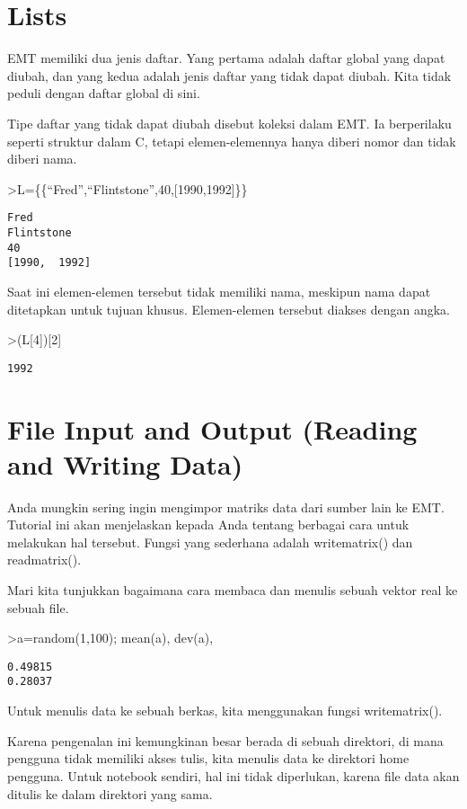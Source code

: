 \documentclass[
]{book}
\begin{document}
\section{Lists}\label{lists}

EMT memiliki dua jenis daftar. Yang pertama adalah daftar global yang dapat diubah, dan yang kedua adalah jenis daftar yang tidak dapat diubah. Kita tidak peduli dengan daftar global di sini.

Tipe daftar yang tidak dapat diubah disebut koleksi dalam EMT. Ia berperilaku seperti struktur dalam C, tetapi elemen-elemennya hanya diberi nomor dan tidak diberi nama.

\textgreater L=\{\{``Fred'',``Flintstone'',40,{[}1990,1992{]}\}\}

\begin{verbatim}
Fred
Flintstone
40
[1990,  1992]
\end{verbatim}

Saat ini elemen-elemen tersebut tidak memiliki nama, meskipun nama dapat ditetapkan untuk tujuan khusus. Elemen-elemen tersebut diakses dengan angka.

\textgreater(L{[}4{]}){[}2{]}

\begin{verbatim}
1992
\end{verbatim}

\section{File Input and Output (Reading and Writing Data)}\label{file-input-and-output-reading-and-writing-data}

Anda mungkin sering ingin mengimpor matriks data dari sumber lain ke EMT. Tutorial ini akan menjelaskan kepada Anda tentang berbagai cara untuk melakukan hal tersebut. Fungsi yang sederhana adalah writematrix() dan readmatrix().

Mari kita tunjukkan bagaimana cara membaca dan menulis sebuah vektor real ke sebuah file.

\textgreater a=random(1,100); mean(a), dev(a),

\begin{verbatim}
0.49815
0.28037
\end{verbatim}

Untuk menulis data ke sebuah berkas, kita menggunakan fungsi writematrix().

Karena pengenalan ini kemungkinan besar berada di sebuah direktori, di mana pengguna tidak memiliki akses tulis, kita menulis data ke direktori home pengguna. Untuk notebook sendiri, hal ini tidak diperlukan, karena file data akan ditulis ke dalam direktori yang sama.
\end{document}
